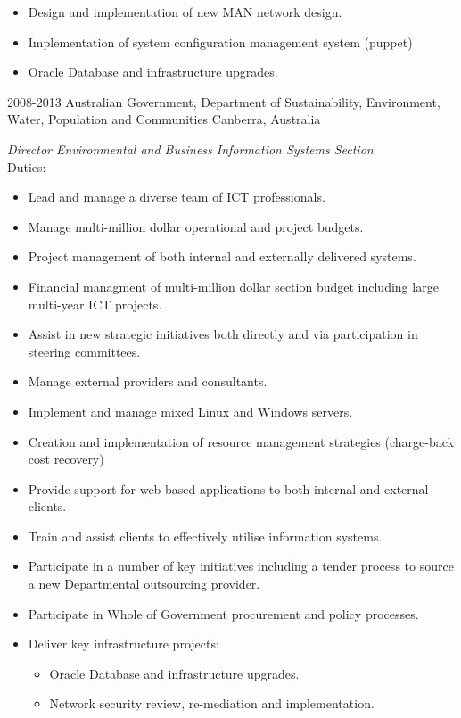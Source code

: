\documentclass[]{friggeri-cv} %
\begin{document}
{\begin{entrylist}
{\begin{itemize}
\begin{itemize}
\item Design and implementation of new MAN network design.
\item Implementation of system configuration management system (puppet)
\item Oracle Database and infrastructure upgrades.
\end{itemize}
\end{itemize}}
\entry
{2008-2013}
{Australian Government, Department of Sustainability, Environment, Water, Population and Communities}
{Canberra, Australia}
{\emph{Director Environmental and Business Information Systems Section} \\
Duties:
\begin{itemize}
\item Lead and manage a diverse team of ICT professionals.
\item Manage multi-million dollar operational and project budgets.
\item Project management of both internal and externally delivered systems.
\item Financial managment of multi-million dollar section budget including large multi-year ICT projects.
\item Assist in new strategic initiatives both directly and via participation in steering committees.
\item Manage external providers and consultants.
\item Implement and manage mixed Linux and Windows servers.
\item Creation and implementation of resource management strategies (charge-back cost recovery)
\item Provide support for web based applications to both internal and external clients.
\item Train and assist clients to effectively utilise information systems.
\item Participate in a number of key initiatives including a tender process to source a new Departmental outsourcing provider.
\item Participate in Whole of Government procurement and policy processes.
\item Deliver key infrastructure projects:
\begin{itemize}
\item Oracle Database and infrastructure upgrades.
\item Network security review, re-mediation and implementation.
\end{itemize}
\end{itemize}}
\end{entrylist}}
\end{document}
